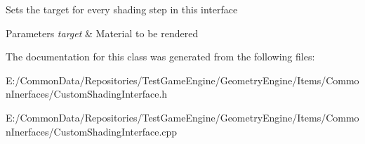 Sets the target for every shading step in this interface 
\begin{DoxyParams}{Parameters}
{\em target} & Material to be rendered \\
\hline
\end{DoxyParams}


The documentation for this class was generated from the following files\+:\begin{DoxyCompactItemize}
\item 
E\+:/\+Common\+Data/\+Repositories/\+Test\+Game\+Engine/\+Geometry\+Engine/\+Items/\+Common\+Inerfaces/Custom\+Shading\+Interface.\+h\item 
E\+:/\+Common\+Data/\+Repositories/\+Test\+Game\+Engine/\+Geometry\+Engine/\+Items/\+Common\+Inerfaces/Custom\+Shading\+Interface.\+cpp\end{DoxyCompactItemize}
